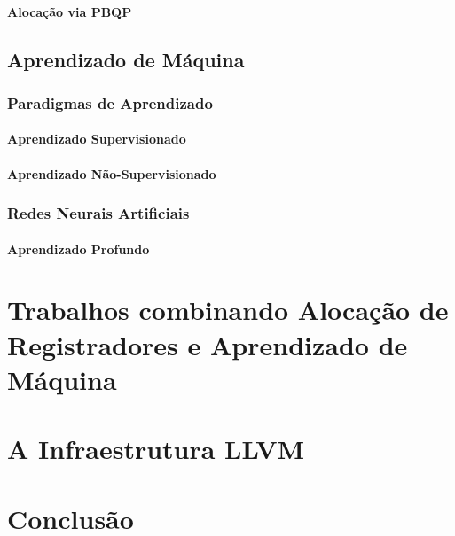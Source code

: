 \documentclass[
	12pt,				%
	openright,			%
	oneside,			%
	a4paper,			%
	tccpreliminar,			%
	]{ABNT-DC-UEL}
\begin{document}
\subsubsection{Alocação via PBQP}

\section{Aprendizado de Máquina}

\subsection{Paradigmas de Aprendizado}

\subsubsection{Aprendizado Supervisionado}

\subsubsection{Aprendizado Não-Supervisionado}

\subsection{Redes Neurais Artificiais}

\subsubsection{Aprendizado Profundo}

\chapter{Trabalhos combinando Alocação de Registradores e Aprendizado de Máquina}

\chapter{A Infraestrutura LLVM}

\chapter{Conclusão}

\lipsum[31-33]

\postextual
\end{document}
